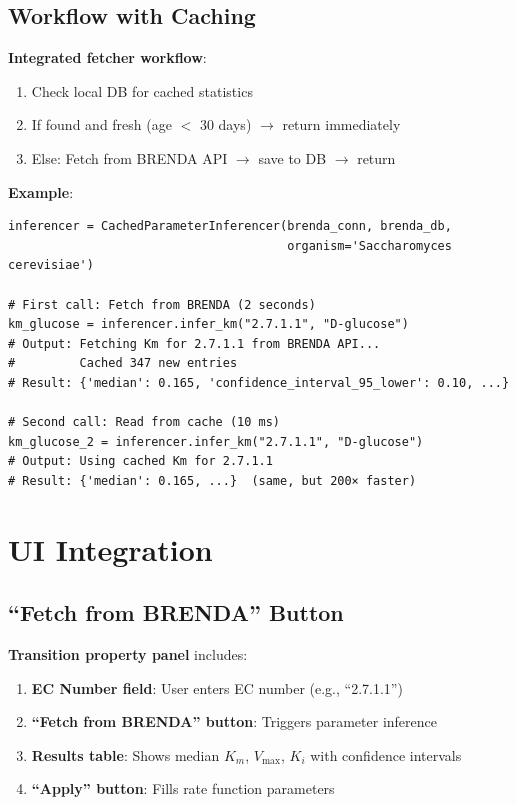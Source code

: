 \subsection{Workflow with Caching}
\label{subsec:caching-workflow}

\textbf{Integrated fetcher workflow}:

\begin{enumerate}
    \item Check local DB for cached statistics
    \item If found and fresh (age $<$ 30 days) $\to$ return immediately
    \item Else: Fetch from BRENDA API $\to$ save to DB $\to$ return
\end{enumerate}

\textbf{Example}:

\begin{verbatim}
inferencer = CachedParameterInferencer(brenda_conn, brenda_db, 
                                       organism='Saccharomyces cerevisiae')

# First call: Fetch from BRENDA (2 seconds)
km_glucose = inferencer.infer_km("2.7.1.1", "D-glucose")
# Output: Fetching Km for 2.7.1.1 from BRENDA API...
#         Cached 347 new entries
# Result: {'median': 0.165, 'confidence_interval_95_lower': 0.10, ...}

# Second call: Read from cache (10 ms)
km_glucose_2 = inferencer.infer_km("2.7.1.1", "D-glucose")
# Output: Using cached Km for 2.7.1.1
# Result: {'median': 0.165, ...}  (same, but 200× faster)
\end{verbatim}

\section{UI Integration}
\label{sec:brenda-ui-integration}

\subsection{``Fetch from BRENDA'' Button}
\label{subsec:fetch-from-brenda-button}

\textbf{Transition property panel} includes:

\begin{enumerate}
    \item \textbf{EC Number field}: User enters EC number (e.g., ``2.7.1.1'')
    \item \textbf{``Fetch from BRENDA'' button}: Triggers parameter inference
    \item \textbf{Results table}: Shows median $K_m$, $V_{\max}$, $K_i$ with confidence intervals
    \item \textbf{``Apply'' button}: Fills rate function parameters
\end{enumerate}

